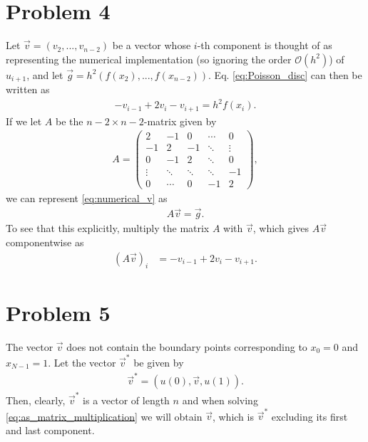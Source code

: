 \documentclass[english,notitlepage,reprint,nofootinbib]{revtex4-2}  %
\begin{document}
\section{Problem 4}
Let $\vec{v} = (v_2,...,v_{n-2})$ be a vector whose $i$-th component is thought of as representing the numerical implementation (so ignoring the order $\mathcal{O}(h^2)$) of $u_{i+1}$, and let $\vec{g} = h^2(f(x_2),...,f(x_{n-2}))$. Eq. \eqref{eq:Poisson_disc} can then be written as 
\begin{align}
    -v_{i-1} + 2v_{i} - v_{i+1} = h^2f(x_i).    \label{eq:numerical_v}
\end{align}
If we let $A$ be the \(n-2\times n-2\)-matrix given by
\begin{align}
    A = \begin{pmatrix}
        2 & -1 & 0 & \cdots & 0 \\
        -1 & 2 & -1 & \ddots & \vdots \\
        0 & -1 & 2 & \ddots & 0 \\
        \vdots & \ddots & \ddots & \ddots & -1 \\
        0 & \cdots & 0 & -1 & 2
    \end{pmatrix},
\end{align}
we can represent \eqref{eq:numerical_v} as 
\begin{align}
    A\vec{v} = \vec{g}. \label{eq:as_matrix_multiplication}
\end{align}
To see that this explicitly, multiply the matrix $A$ with $\vec{v}$, which gives $A\vec{v}$ componentwise as
\begin{align}
    (A\vec{v})_{i} &= -v_{i-1} + 2v_{i} - v_{i+1}.
\end{align}



\section{Problem 5}
The vector $\vec{v}$ does not contain the boundary points corresponding to $x_{0}=0$ and $x_{N-1}=1$. Let the vector $\vec{v}^*$ be given by 
\begin{align}
    \vec{v}^* = (u(0), \vec{v}, u(1)).
\end{align}
Then, clearly, \(\vec{v}^*\) is a vector of length $n$ and when solving \eqref{eq:as_matrix_multiplication} we will obtain $\vec{v}$, which is \(\vec{v}^*\) excluding its first and last component.
\end{document}
